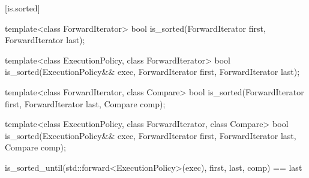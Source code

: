 [is.sorted]{}

%
\begin{itemdecl}
template<class ForwardIterator>
  bool is_sorted(ForwardIterator first, ForwardIterator last);
\end{itemdecl}

\begin{itemdescr}
\pnum
\returns {}
\end{itemdescr}

%
\begin{itemdecl}
template<class ExecutionPolicy, class ForwardIterator>
  bool is_sorted(ExecutionPolicy&& exec,
                 ForwardIterator first, ForwardIterator last);
\end{itemdecl}

\begin{itemdescr}
\pnum
\returns {}
\end{itemdescr}


%
\begin{itemdecl}
template<class ForwardIterator, class Compare>
  bool is_sorted(ForwardIterator first, ForwardIterator last,
                 Compare comp);
\end{itemdecl}

\begin{itemdescr}
\pnum
\returns {}
\end{itemdescr}


%
\begin{itemdecl}
template<class ExecutionPolicy, class ForwardIterator, class Compare>
  bool is_sorted(ExecutionPolicy&& exec,
                 ForwardIterator first, ForwardIterator last,
                 Compare comp);
\end{itemdecl}

\begin{itemdescr}
\pnum
\returns
\begin{codeblock}
is_sorted_until(std::forward<ExecutionPolicy>(exec), first, last, comp) == last
\end{codeblock}
\end{itemdescr}


